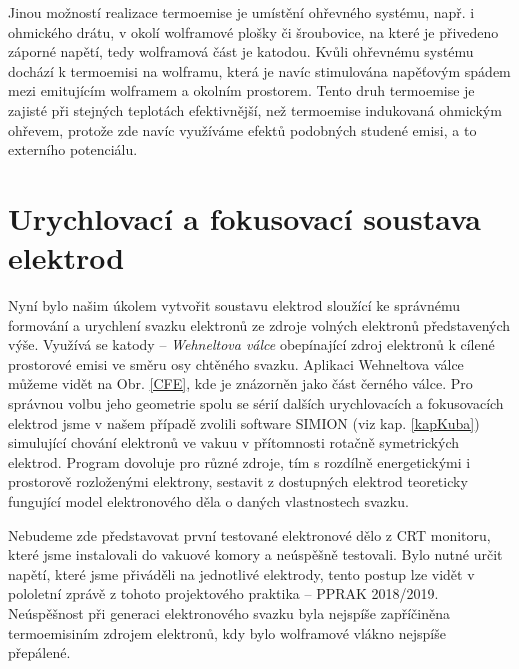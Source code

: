 \par Jinou možností realizace termoemise je umístění ohřevného systému, např. i ohmického drátu, v okolí wolframové plošky či šroubovice, na které je přivedeno záporné napětí, tedy wolframová část je katodou. Kvůli ohřevnému systému dochází k termoemisi na wolframu, která je navíc stimulována napěťovým spádem mezi emitujícím wolframem a okolním prostorem. Tento druh termoemise je zajisté při stejných teplotách efektivnější, než termoemise indukovaná ohmickým ohřevem, protože zde navíc využíváme efektů podobných studené emisi, a to externího potenciálu.
\section{Urychlovací a fokusovací soustava elektrod}
Nyní bylo našim úkolem vytvořit soustavu elektrod sloužící ke správnému formování a urychlení svazku elektronů ze zdroje volných elektronů představených výše. Využívá se katody -- \textit{Wehneltova válce} obepínající zdroj elektronů k cílené prostorové emisi ve směru osy chtěného svazku. Aplikaci Wehneltova válce můžeme vidět na Obr. \ref{CFE}, kde je znázorněn jako část černého válce. Pro správnou volbu jeho geometrie spolu se sérií dalších urychlovacích a fokusovacích elektrod jsme v našem případě zvolili software SIMION (viz kap. \ref{kapKuba}) simulující chování elektronů ve vakuu v přítomnosti rotačně symetrických elektrod. Program dovoluje pro různé zdroje, tím s rozdílně energetickými i prostorově rozloženými elektrony, sestavit z dostupných elektrod teoreticky fungující model elektronového děla o daných vlastnostech svazku.
\par Nebudeme zde představovat první testované elektronové dělo z CRT monitoru, které jsme instalovali do vakuové komory a neúspěšně testovali. Bylo nutné určit napětí, které jsme přiváděli na jednotlivé elektrody, tento postup lze vidět v pololetní zprávě z tohoto projektového praktika -- PPRAK 2018/2019. Neúspěšnost při generaci elektronového svazku byla nejspíše zapříčiněna termoemisiním zdrojem elektronů, kdy bylo wolframové vlákno nejspíše přepálené.

